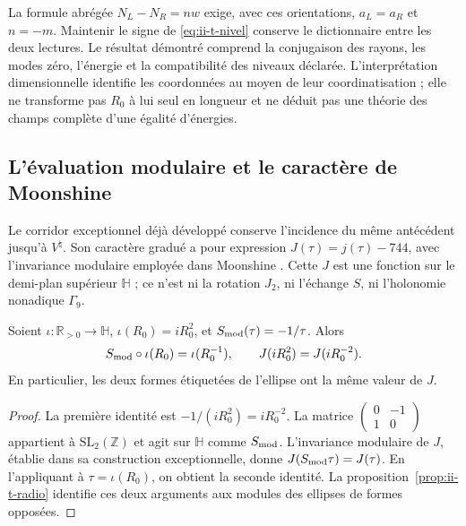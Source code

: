 La formule abrégée \(N_L-N_R=nw\) exige, avec ces orientations,
\(a_L=a_R\) et \(n=-m\). Maintenir le signe de
\eqref{eq:ii-t-nivel} conserve le dictionnaire entre les deux lectures.
Le résultat démontré comprend la conjugaison des rayons, les modes
zéro, l’énergie et la compatibilité des niveaux déclarée. L’interprétation
dimensionnelle identifie les coordonnées au moyen de leur coordinatisation ; elle ne transforme pas
\(R_0\) à lui seul en longueur et ne déduit pas une théorie des champs
complète d’une égalité d’énergies.

\subsection{L’évaluation modulaire et le caractère de Moonshine}

Le corridor exceptionnel déjà développé conserve l’incidence du même
antécédent jusqu’à \(V^\natural\). Son caractère gradué a pour expression
\(J(\tau)=j(\tau)-744\), avec l’invariance modulaire employée dans
Moonshine \cite{flm,borcherds}. Cette \(J\) est une fonction sur le
demi-plan supérieur \(\mathbb H\) ; ce n’est ni la rotation \(J_2\), ni
l’échange \(S\), ni l’holonomie nonadique \(\Gamma_9\).

\begin{proposition}
\label{prop:ii-t-modular}
Soient \(\iota:\mathbb R_{>0}\to\mathbb H\),
\(\iota(R_0)=iR_0^2\), et
\(S_{\rm mod}(\tau)=-1/\tau\). Alors
\begin{equation}
 S_{\rm mod}\circ\iota(R_0)=\iota(R_0^{-1}),\qquad
 J(iR_0^2)=J(iR_0^{-2}).
 \label{eq:ii-t-modular}
\end{equation}
En particulier, les deux formes étiquetées de l’ellipse ont la même
valeur de \(J\).
\end{proposition}

\begin{proof}
La première identité est
\(-1/(iR_0^2)=iR_0^{-2}\). La matrice
\(\left(\begin{smallmatrix}0&-1\\1&0\end{smallmatrix}\right)\)
appartient à \(\mathrm{SL}_2(\mathbb Z)\) et agit sur
\(\mathbb H\) comme \(S_{\rm mod}\). L’invariance modulaire de
\(J\), établie dans sa construction exceptionnelle, donne
\(J(S_{\rm mod}\tau)=J(\tau)\). En l’appliquant à
\(\tau=\iota(R_0)\), on obtient la seconde identité.
La proposition~\ref{prop:ii-t-radio} identifie ces deux arguments
aux modules des ellipses de formes opposées.
\end{proof}

